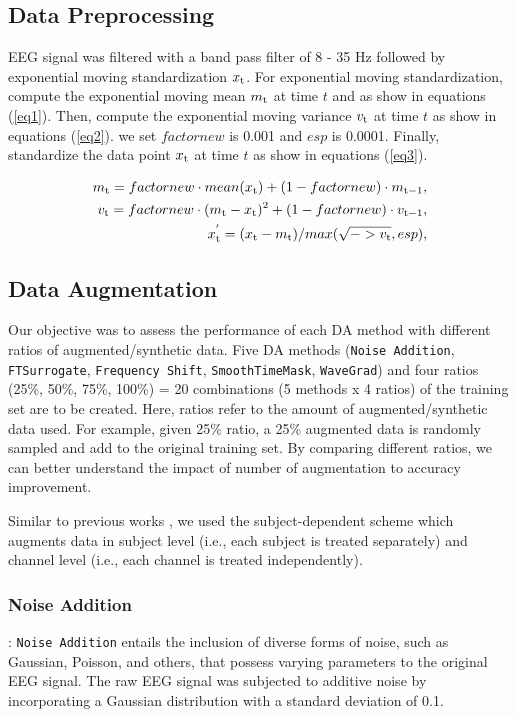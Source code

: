 \documentclass[runningheads]{llncs}
\begin{document}
\subsection{Data Preprocessing}
EEG signal was filtered with a band pass filter of 8 - 35 Hz followed by exponential moving standardization $x_{\rm t}$. For exponential moving standardization, compute the exponential moving mean $m_{\rm t}$ at time $t$ and as show in equations (\ref{eq1}).
Then, compute the exponential moving variance $v_{\rm t}$ at time $t$ as show in equations (\ref{eq2}).
we set $factornew$ is 0.001 and $esp$ is 0.0001. Finally, standardize the data point $x_{\rm t}$ at time $t$ as show in equations (\ref{eq3}).

\begin{eqnarray} 
m_{\rm t} = factornew \cdot mean(x_{\rm t}) + (1 - factornew) \cdot m_{\rm t-1}, \label{eq1}\\
v_{\rm t} = factornew\cdot (m_{\rm t} - x_{\rm t})^{2} + (1 - factornew) \cdot v_{\rm t-1} , \label{eq2} \\ 
x_{\rm t}^{'}  = (x_{\rm t}-m_{\rm t})/max(\sqrt{->v_{\rm t}},esp), \label{eq3} 
\end{eqnarray}


\subsection{Data Augmentation}
Our objective was to assess the performance of each DA method with different ratios of augmented/synthetic data. Five DA methods (\texttt{Noise Addition}, \texttt{FTSurrogate}, \texttt{Frequency Shift}, \texttt{SmoothTimeMask}, \texttt{WaveGrad}) and four ratios (25\%, 50\%, 75\%, 100\%) = 20 combinations (5 methods x 4 ratios) of the training set are to be created.  Here, ratios refer to the amount of augmented/synthetic data used.  For example, given 25\% ratio, a 25\% augmented data is randomly sampled and add to the original training set.  By comparing different ratios, we can better understand the impact of number of augmentation to accuracy improvement.

Similar to previous works \cite{rommel2021cadda,mohsenvand2020contrastive,leeb2008bci,terzano2001atlas}, we used the subject-dependent scheme which augments data in subject level (i.e., each subject is treated separately) and channel level (i.e., each channel is treated independently).

\subsubsection{Noise Addition}: \texttt{Noise Addition} entails the inclusion of diverse forms of noise, such as Gaussian, Poisson, and others, that possess varying parameters to the original EEG signal. The raw EEG signal was subjected to additive noise by incorporating a Gaussian distribution with a standard deviation of 0.1.
\end{document}
